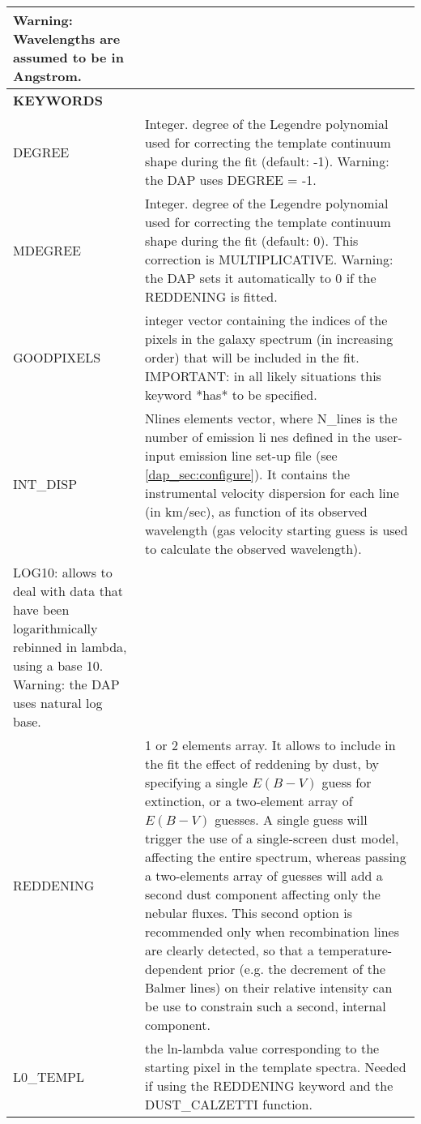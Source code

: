 \begin{center}
\begin{longtable}{p{2.7cm}| p{11.1cm}}
      Warning:  Wavelengths are assumed to be in Angstrom. \\
\hline
{\bf KEYWORDS}  & \\
\hline
DEGREE & Integer. degree of the Legendre polynomial used for correcting the
       template continuum shape during the fit (default: -1). Warning:
       the DAP uses DEGREE = -1.\\
%
MDEGREE & Integer. degree of the Legendre polynomial used for correcting
       the template continuum shape during the fit (default: 0).
       This correction is MULTIPLICATIVE. Warning: the DAP sets it automatically
       to 0 if the REDDENING is fitted.\\
%
GOODPIXELS &  integer vector containing the indices of the pixels in
       the galaxy spectrum (in increasing order) that will be
       included in the fit. IMPORTANT: in all likely situations this
       keyword *has* to be specified.\\
%
INT\_DISP & Nlines elements vector, where N\_lines is the number of
           emission li nes defined in the user-input emission line set-up file
           (see \ref{dap_sec:configure}). It contains the instrumental velocity
           dispersion for each line (in km/sec), as function of its observed
           wavelength (gas velocity starting guess is used to calculate the
           observed wavelength).\\
%
LOG10: allows to deal with data that have been logarithmically
       rebinned in lambda, using a base 10. Warning: the DAP uses 
       natural log base. \\
%
REDDENING & 1 or 2 elements array. It allows to include in the fit the
          effect of reddening by dust, by specifying a single $E(B-V)$ guess for
          extinction, or a two-element array of $E(B-V)$ guesses. A single guess
          will trigger the use of a single-screen dust model, affecting the
          entire spectrum, whereas passing a two-elements array of guesses will
          add a second dust component affecting only the nebular fluxes. This
          second option is recommended only when recombination lines are clearly
          detected, so that a temperature-dependent prior (e.g. the decrement of
          the Balmer lines) on their relative intensity can be use to constrain
          such a second, internal component.\\
%
L0\_TEMPL & the ln-lambda value corresponding to the starting pixel
       in the template spectra. Needed if using the REDDENING keyword
       and the DUST\_CALZETTI function. \\

\end{longtable}
\end{center}
